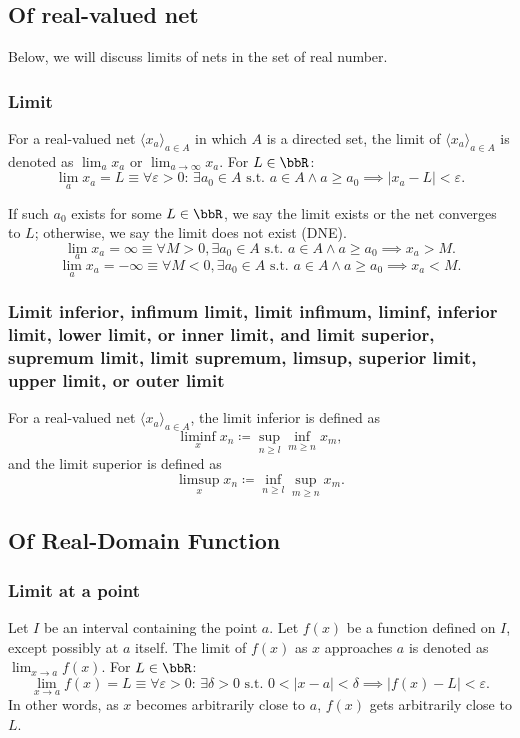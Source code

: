\documentclass[a4paper,12pt]{report}
\begin{document}
\subsection{Of real-valued net}
Below, we will discuss limits of nets in the set of real number.
\subsubsection{Limit}
For a real-valued net $\langle x_a\rangle_{a\in A}$ in which $A$ is a directed set, the limit of $\langle x_a\rangle_{a\in A}$ is denoted as $\lim_a x_a$ or $\lim_{a\to\infty} x_a$. For $L\in\bbR$:
\[\lim_ax_a = L \equiv \forall \varepsilon > 0:\, \exists a_0 \in A\text{\ s.t.\ } a\in A\land a\ge a_0\implies |x_a - L| < \varepsilon.\]

If such $a_0$ exists for some $L\in\bbR$, we say the limit exists or the net converges to $L$; otherwise, we say the limit does not exist (DNE).
\[\lim_{a}x_a=\infty \equiv \forall M > 0, \exists a_0 \in A \text{\ s.t.\ } a\in A\land a\geq a_0 \implies x_a > M.\]
\[\lim_{a}x_a=-\infty \equiv \forall M < 0, \exists a_0 \in A \text{\ s.t.\ } a\in A\land a\geq a_0 \implies x_a < M.\]
\subsubsection{Limit inferior, infimum limit, limit infimum, liminf, inferior limit, lower limit, or inner limit, and limit superior, supremum limit, limit supremum, limsup, superior limit, upper limit, or outer limit}
For a real-valued net $\langle x_a\rangle_{a\in A}$, the limit inferior is defined as
\[\liminf_{x}x_n\coloneq\sup_{n\geq l}\inf_{m\geq n}x_m,\]
and the limit superior is defined as
\[\limsup_{x}x_n\coloneq\inf_{n\geq l}\sup_{m\geq n}x_m.\]
\subsection{Of Real-Domain Function}
\subsubsection{Limit at a point}
Let \(I\) be an interval containing the point \(a\). Let \( f(x) \) be a function defined on \(I\), except possibly at \(a\) itself. The limit of \( f(x) \) as \( x \) approaches \( a \) is denoted as $\lim_{x \to a} f(x)$. For $L\in\bbR$:
\[\lim_{x \to a} f(x) = L \equiv \forall \varepsilon > 0:\, \exists \delta > 0 \text{\ s.t.\ } 0 < |x - a| < \delta \implies |f(x) - L| < \varepsilon.\]
In other words, as \(x\) becomes arbitrarily close to \(a\), \(f(x)\) gets arbitrarily close to \(L\).
\end{document}
